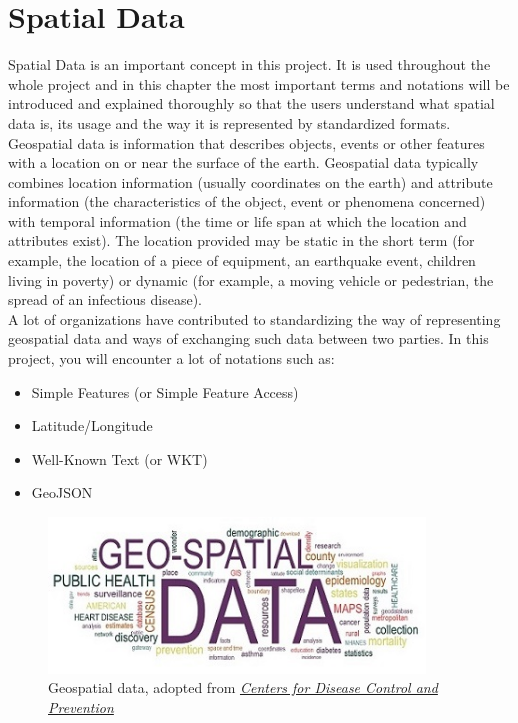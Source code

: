\chapter{Spatial Data}\label{ch:spatial-data}
Spatial Data is an important concept in this project. It is used throughout the whole project and in this chapter the most
important terms and notations will be introduced and explained thoroughly so that the users understand what spatial data is,
its usage and the way it is represented by standardized formats.\\
\newline
Geospatial data is information that describes objects, events or other features with a location on
or near the surface of the earth.
Geospatial data typically combines location information (usually coordinates on the earth) and attribute information
(the characteristics of the object, event or phenomena concerned) with temporal information
(the time or life span at which the location and attributes exist).
The location provided may be static in the short term (for example, the location of a piece of equipment,
an earthquake event, children living in poverty) or dynamic
(for example, a moving vehicle or pedestrian, the spread of an infectious disease).~\cite{IBMGeoSpatialData}\\
\newline
A lot of organizations have contributed to standardizing the way of representing geospatial data and ways of
exchanging such data between two parties. In this project, you will encounter a lot of notations such as:
\begin{itemize}
    \item Simple Features (or Simple Feature Access)
    \item Latitude/Longitude
    \item Well-Known Text (or WKT)
    \item GeoJSON
\end{itemize}

\begin{figure}[H]
    \centering
    \includegraphics[width=10cm]{./Figures/Spatial_Data/geospatial_data}
    \caption{Geospatial data, adopted from \href{https://www.cdc.gov/dhdsp/maps/gisx/resources/geo-spatial-data.html}{\textit{Centers for Disease Control and Prevention}}~\cite{CDC}}\label{fig:figure}
\end{figure}
